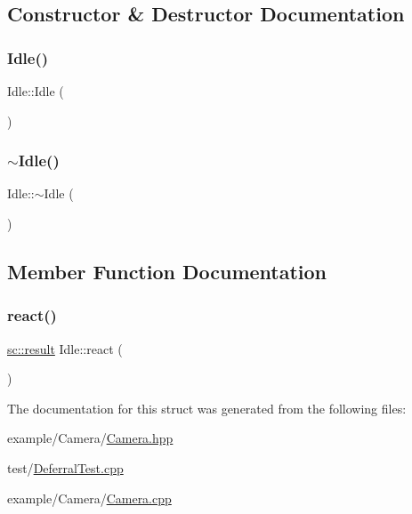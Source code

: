\subsection{Constructor \& Destructor Documentation}
\mbox{\label{struct_idle_a766bf3621da665c0f6a508084d1833e2}} 
\subsubsection{\texorpdfstring{Idle()}{Idle()}}
{\footnotesize\ttfamily Idle\+::\+Idle (\begin{DoxyParamCaption}{ }\end{DoxyParamCaption})}

\mbox{\label{struct_idle_a311e6fd824c33b1628911db3e2220449}} 
\subsubsection{\texorpdfstring{$\sim$\+Idle()}{~Idle()}}
{\footnotesize\ttfamily Idle\+::$\sim$\+Idle (\begin{DoxyParamCaption}{ }\end{DoxyParamCaption})}



\subsection{Member Function Documentation}
\mbox{\label{struct_idle_a7ae48265e28cc7188491e2a38aec83d1}} 
\subsubsection{\texorpdfstring{react()}{react()}}
{\footnotesize\ttfamily \mbox{\hyperlink{namespaceboost_1_1statechart_abe807f6598b614d6d87bb951ecd92331}{sc\+::result}} Idle\+::react (\begin{DoxyParamCaption}\item[{const \mbox{\hyperlink{struct_ev_config}{Ev\+Config}} \&}]{ }\end{DoxyParamCaption})}



The documentation for this struct was generated from the following files\+:\begin{DoxyCompactItemize}
\item 
example/\+Camera/\mbox{\hyperlink{_camera_8hpp}{Camera.\+hpp}}\item 
test/\mbox{\hyperlink{_deferral_test_8cpp}{Deferral\+Test.\+cpp}}\item 
example/\+Camera/\mbox{\hyperlink{_camera_8cpp}{Camera.\+cpp}}\end{DoxyCompactItemize}

